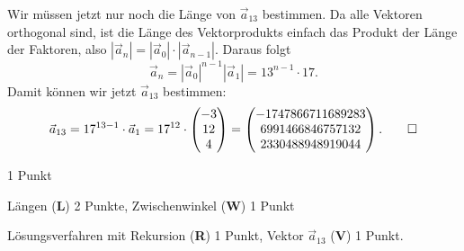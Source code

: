 \begin{loesung}
\begin{teilaufgaben}
Wir müssen jetzt nur noch die Länge von $\vec{a}_{13}$ bestimmen.
Da alle Vektoren orthogonal sind, ist die Länge des Vektorprodukts
einfach das Produkt der Länge der Faktoren, also
$|\vec{a}_n|=|\vec{a}_0|\cdot|\vec{a}_{n-1}|$.
Daraus folgt
\[
\vec{a}_n
=
|\vec{a}_0|^{n-1} |\vec{a}_1|
=
13^{n-1}\cdot 17.
\]
Damit können wir jetzt $\vec{a}_{13}$ bestimmen:
\[
\vec{a}_{13}
=
17^{13-1}\cdot \vec{a}_1
=
17^{12}\cdot
\begin{pmatrix}
   -3\\
   12\\
    4
\end{pmatrix}
=
\begin{pmatrix}
-1747866711689283 \\
6991466846757132 \\
2330488948919044
\end{pmatrix}.
\qedhere
\]
\end{teilaufgaben}
\end{loesung}

%

\begin{bewertung}
\begin{teilaufgaben}
\item 1 Punkt
\item Längen ({\bf L}) 2 Punkte, Zwischenwinkel ({\bf W}) 1 Punkt
\item Lösungsverfahren mit Rekursion ({\bf R}) 1 Punkt,
Vektor $\vec{a}_{13}$ ({\bf V}) 1 Punkt.
\end{teilaufgaben}
\end{bewertung}
